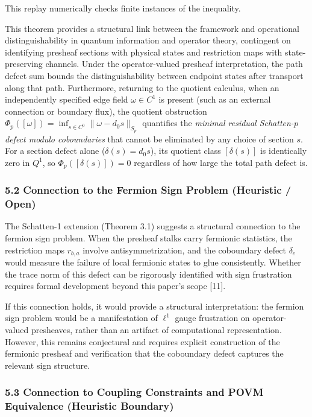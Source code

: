 \documentclass[
]{article}
\begin{document}
This replay numerically checks finite instances of the inequality.

This theorem provides a structural link between the framework and operational distinguishability in quantum information and operator theory, contingent on identifying presheaf sections with physical states and restriction maps with state-preserving channels. Under the operator-valued presheaf interpretation, the path defect sum bounds the distinguishability between endpoint states after transport along that path. Furthermore, returning to the quotient calculus, when an independently specified edge field \(\omega \in C^1\) is present (such as an external connection or boundary flux), the quotient obstruction \(\Phi_p([\omega]) = \inf_{s \in C^0} \|\omega - d_0 s\|_{S_p}\) quantifies the \emph{minimal residual Schatten-\(p\) defect modulo coboundaries} that cannot be eliminated by any choice of section \(s\). For a section defect alone (\(\delta(s) = d_0 s\)), its quotient class \([\delta(s)]\) is identically zero in \(Q^1\), so \(\Phi_p([\delta(s)]) = 0\) regardless of how large the total path defect is.

\subsubsection{5.2 Connection to the Fermion Sign Problem (Heuristic / Open)}\label{connection-to-the-fermion-sign-problem-heuristic-open}

The Schatten-1 extension (Theorem 3.1) suggests a structural connection to the fermion sign problem. When the presheaf stalks carry fermionic statistics, the restriction maps \(r_{b,a}\) involve antisymmetrization, and the coboundary defect \(\delta_e\) would measure the failure of local fermionic states to glue consistently. Whether the trace norm of this defect can be rigorously identified with sign frustration requires formal development beyond this paper's scope {[}11{]}.

If this connection holds, it would provide a structural interpretation: the fermion sign problem would be a manifestation of \(\ell^1\) gauge frustration on operator-valued presheaves, rather than an artifact of computational representation. However, this remains conjectural and requires explicit construction of the fermionic presheaf and verification that the coboundary defect captures the relevant sign structure.

\subsubsection{5.3 Connection to Coupling Constraints and POVM Equivalence (Heuristic Boundary)}\label{connection-to-coupling-constraints-and-povm-equivalence-heuristic-boundary}
\end{document}
